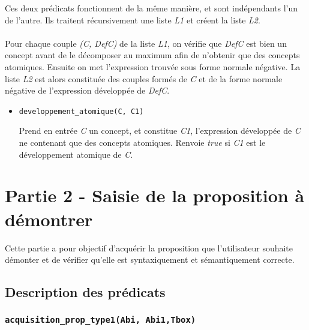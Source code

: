 \documentclass{article}
\newcommand{\code}[1]{\colorbox{light-gray}{\texttt{#1}}}
\begin{document}
Ces deux prédicats fonctionnent de la même manière, et sont indépendants l'un de l'autre. Ils traitent récursivement une liste \textit{L1} et créent la liste \textit{L2}.
\\\\
Pour chaque couple \textit{(C, DefC)} de la liste \textit{L1}, on vérifie que \textit{DefC} est bien un concept avant de le décomposer au maximum afin de n'obtenir que des concepts atomiques. Ensuite on met l'expression trouvée sous forme normale négative. La liste \textit{L2} est alors constituée des couples formés de \textit{C} et de la forme normale négative de l'expression développée de \textit{DefC}.

\begin{itemize}    
    \item \code{developpement\_atomique(C, C1)}

    Prend en entrée \textit{C} un concept, et constitue \textit{C1}, l'expression développée de \textit{C} ne contenant que des concepts atomiques. Renvoie \textit{true} si \textit{C1} est le développement atomique de \textit{C}.
    
\end{itemize}



\clearpage

\section{Partie 2 - Saisie de la proposition à démontrer}

Cette partie a pour objectif d'acquérir la proposition que l'utilisateur souhaite démonter et de vérifier qu'elle est syntaxiquement et sémantiquement correcte.
\subsection{Description des prédicats}

\subsubsection{\code{acquisition\_prop\_type1(Abi, Abi1,Tbox)}}
\end{document}
